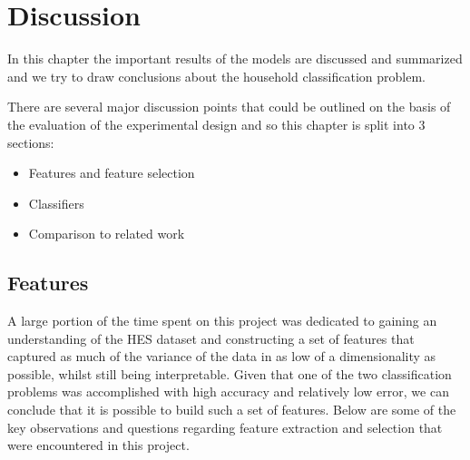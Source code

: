\chapter{Discussion}

In this chapter the important results of the models are discussed and summarized and we try to draw conclusions about the household classification problem.

There are several major discussion points that could be outlined on the basis of the evaluation of the experimental design and so this chapter is split into 3 sections:

\begin{itemize}
\item Features and feature selection
\item Classifiers
\item Comparison to related work
\end{itemize}



\section{Features}

A large portion of the time spent on this project was dedicated to gaining an understanding of the HES dataset and constructing a set of features that captured as much of the variance of the data in as low of a dimensionality as possible, whilst still being interpretable. Given that one of the two classification problems was accomplished with high accuracy and relatively low error, we can conclude that it is possible to build such a set of features. Below are some of the key observations and questions regarding feature extraction and selection that were encountered in this project.

